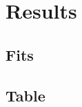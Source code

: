 \documentclass[9pt]{beamer}
\begin{document}
\section{Results}
	\subsection{Fits}
		
		
		
		
		
		
		
		
		
		
		
		
	\subsection{Table}
		


%
\end{document}
